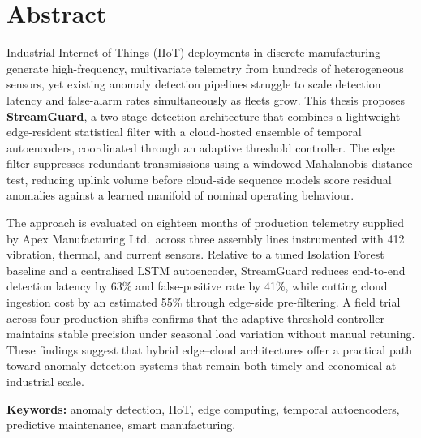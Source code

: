 \chapter*{Abstract}
Industrial Internet-of-Things (IIoT) deployments in discrete manufacturing generate
high-frequency, multivariate telemetry from hundreds of heterogeneous sensors, yet existing
anomaly detection pipelines struggle to scale detection latency and false-alarm rates
simultaneously as fleets grow. This thesis proposes \textbf{StreamGuard}, a two-stage
detection architecture that combines a lightweight edge-resident statistical filter with a
cloud-hosted ensemble of temporal autoencoders, coordinated through an adaptive threshold
controller. The edge filter suppresses redundant transmissions using a windowed
Mahalanobis-distance test, reducing uplink volume before cloud-side sequence models score
residual anomalies against a learned manifold of nominal operating behaviour.

The approach is evaluated on eighteen months of production telemetry supplied by Apex
Manufacturing Ltd.\ across three assembly lines instrumented with 412 vibration, thermal, and
current sensors. Relative to a tuned Isolation Forest baseline and a centralised LSTM
autoencoder, StreamGuard reduces end-to-end detection latency by 63\% and false-positive rate
by 41\%, while cutting cloud ingestion cost by an estimated 55\% through edge-side
pre-filtering. A field trial across four production shifts confirms that the adaptive
threshold controller maintains stable precision under seasonal load variation without manual
retuning. These findings suggest that hybrid edge--cloud architectures offer a practical path
toward anomaly detection systems that remain both timely and economical at industrial scale.

\vspace{0.6cm}
\noindent\textbf{Keywords:} anomaly detection, IIoT, edge computing, temporal autoencoders,
predictive maintenance, smart manufacturing.

